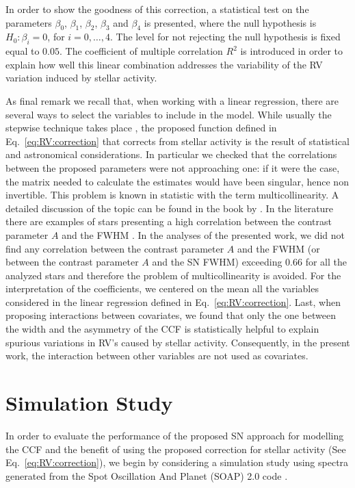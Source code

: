 \documentclass[11pt, oneside]{article}
\begin{document}
In order to show the goodness of this correction, a statistical test on the parameters $\beta_{0}$, $\beta_{1}$, $\beta_{2}$, $\beta_{3}$ and $\beta_{4}$ is presented, where the null hypothesis is $H_{0}: \beta_{i}=0$, for $i=0,\dots,4$. The level for not rejecting the null hypothesis is fixed equal to $0.05$. The coefficient of multiple correlation $R^2$ is introduced in order to explain how well this linear combination addresses the variability of the RV variation induced by stellar activity. 

As final remark we recall that, when working with a linear regression, there are several ways to select the variables to include in the model. While usually the stepwise technique takes place \citep{efroymson1960multiple,hocking1976biometrics}, the proposed function defined in Eq.~\ref{eq:RV:correction} that corrects from stellar activity is the result of statistical and astronomical considerations. In particular we checked that the correlations between the proposed parameters were not approaching one: if it were the case, the matrix needed to calculate the estimates would have been singular, hence non invertible. This problem is known in statistic with the term multicollinearity. A detailed discussion of the topic can be found in the book by \citep{belsley1991}. In the literature there are examples of stars presenting a high correlation between the contrast parameter $A$ and the FWHM \citep{Dumusque:2017aa,Feng:2017aa}. In the analyses of the presented work, we did not find any correlation between the contrast parameter $A$ and the FWHM (or between the contrast parameter $A$ and the SN FWHM) exceeding $0.66$ for all the analyzed stars and therefore the problem of multicollinearity is avoided. For the interpretation of the coefficients, we centered on the mean all the variables considered in the linear regression defined in Eq.~\ref{eq:RV:correction}. Last, when proposing interactions between covariates, we found that only the one between the width and the asymmetry of the CCF is statistically helpful to explain spurious variations in RV's caused by stellar activity. Consequently, in the present work, the interaction between other variables are not used as covariates.

\section{Simulation Study} \label{sec:soap}
In order to evaluate the performance of the proposed SN approach for modelling the CCF and the benefit of using the proposed correction for stellar activity (See Eq.~\ref{eq:RV:correction}), we begin by considering a simulation study using spectra generated from the Spot Oscillation And Planet (SOAP) 2.0 code \citep{Dumusque-2014b}.
\end{document}
